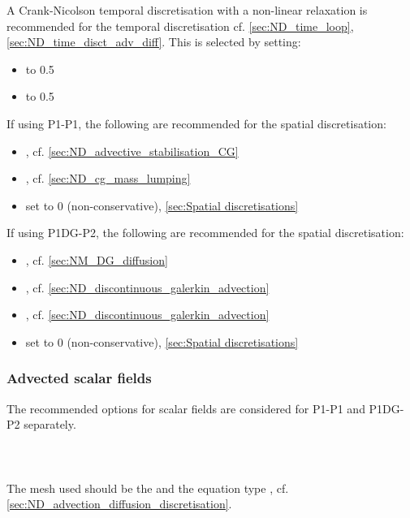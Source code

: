 A Crank-Nicolson temporal discretisation with a non-linear relaxation is recommended for the temporal discretisation cf. \ref{sec:ND_time_loop}, \ref{sec:ND_time_disct_adv_diff}. This is selected by setting:
\begin{itemize}
\item {} to 0.5
\item {} to 0.5
\end{itemize}

If using P1-P1, the following are recommended for the spatial discretisation:
\begin{itemize}
\item {}, cf. \ref{sec:ND_advective_stabilisation_CG}
\item {}, cf. \ref{sec:ND_cg_mass_lumping}
\item {} set to 0 (non-conservative), \ref{sec:Spatial discretisations}
\end{itemize}

If using P1DG-P2, the following are recommended for the spatial discretisation:
\begin{itemize}
\item {}, cf. \ref{sec:NM_DG_diffusion}
\item {}, cf. \ref{sec:ND_discontinuous_galerkin_advection}
\item {}, cf. \ref{sec:ND_discontinuous_galerkin_advection}
\item {} set to 0 (non-conservative), \ref{sec:Spatial discretisations}
\end{itemize}

\subsubsection{Advected scalar fields}
The recommended options for scalar fields are considered for P1-P1 and P1DG-P2 separately. \\ \\
{\bf \Poo} \\ \\
The mesh used should be the  and the equation type , cf. \ref{sec:ND_advection_diffusion_discretisation}. 


